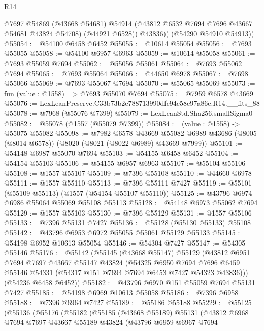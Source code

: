 \begin{lexlean}{R14}
\begin{coremodule}
            @7697
            @54869
            (@43668 @54681)
            @54914
            (@43812 @6532 @7694 @7696 @43667 @54681 @43824 @54708)
            (@44921 @6528))
          @43836))
      (@54290 @54910 @54913))
@55054 := @54100 @6458 @6452
@55055 := @10614 @55054
@55056 := @7693 @55055
@55058 := @54100 @6957 @6963
@55059 := @10614 @55058
@55061 := @7693 @55059 @7694
@55062 := @55056 @55061
@55064 := @7693 @55062 @7694
@55065 := @7693 @55064
@55066 := @44650 @6978
@55067 := @7698 @55066
@55069 := @7693 @55067 @7694
@55070 := @55065 @55069
@55073 := fun (value : @1558) => @7693 @55070 @7694
@55075 := @7959 @6578 @43669
@55076 := LexLeanPreserve.C33b73b2e788713990dfe94c58c97a86e.R14.__fits_88
@55078 := @7968 (@55076 @7399)
@55079 := LexLeanStd.Sha256.smallSigma0
@55082 := @55078 (@1557 (@55079 @7399))
@55084 := (value : @1558) -> @55075 @55082
@55098 := @7982
    @6578
    @43669
    @55082
    @6989
    @43686
    (@8005 (@8014 @6578))
    (@8020 (@8021 (@8022 @6989) @43669 @7999))
@55101 := @54148 @6987 @55070 @7694
@55103 := @54155 @6458 @6452
@55104 := @54154 @55103
@55106 := @54155 @6957 @6963
@55107 := @55104 @55106
@55108 := @1557 @55107
@55109 := @7396 @55108
@55110 := @44660 @6978
@55111 := @1557 @55110
@55113 := @7396 @55111 @7427
@55119 := @55101 (@55109 @55113) (@1557 (@54154 @55107 @55110))
@55125 := @43796 @6974 @6986 @55064 @55069 @55108 @55113
@55128 := @54148 @6973 @55062 @7694
@55129 := @1557 @55103
@55130 := @7396 @55129
@55131 := @1557 @55106
@55133 := @7396 @55131 @7427
@55136 := @55128 (@55130 @55133) @55108
@55142 := @43796 @6953 @6972 @55055 @55061 @55129 @55133
@55145 := @54198 @6952 @10613 @55054
@55146 := @54304 @7427
@55147 := @54305 @55146
@55176 := @55142
    (@55145
      (@43668 @55147)
      @55129
      (@43812
        @6951
        @7694
        @7697
        @43667
        @55147
        @43824
        (@54325
          @6950
          @7694
          @7696
          @6459
          @55146
          @54331
          (@54317 @151 @7694 @7694 @6453 @7427 @54323 @43836)))
      (@54236 @6458 @6452))
@55182 := @43796 @6970 @151 @55059 @7694 @55131 @7427
@55185 := @54198 @6969 @10613 @55058
@55186 := @7396 @6958
@55188 := @7396 @6964 @7427
@55189 := @55186 @55188
@55229 := @55125
    (@55136
      (@55176
        (@55182
          (@55185
            (@43668 @55189)
            @55131
            (@43812
              @6968
              @7694
              @7697
              @43667
              @55189
              @43824
              (@43796
                @6959
                @6967
                @7694

\end{coremodule}
\end{lexlean}
